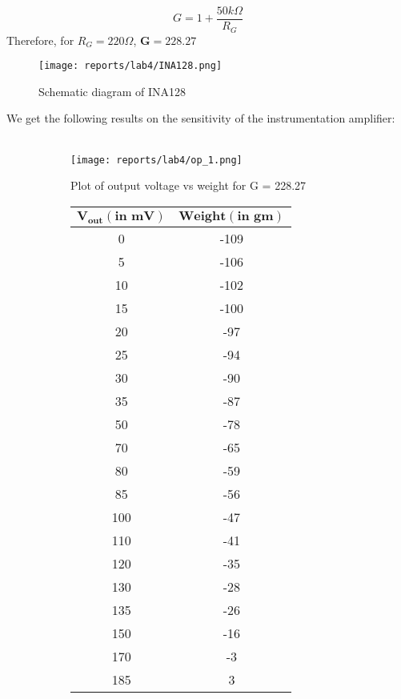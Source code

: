 \documentclass[12pt]{article}
\begin{document}
        \begin{equation}
            G = 1 + \frac{50k\Omega}{R_G}
        \end{equation}
        \noindent
        Therefore, for $R_G = 220\Omega$, $\mathbf{G = 228.27}$\\
        
        \begin{figure}[H]
          \centering
          \texttt{[image: reports/lab4/INA128.png]}
          \caption{Schematic diagram of INA128}
          \label{fig:instru}
        \end{figure}
        \noindent
        We get the following results on the sensitivity of the instrumentation amplifier:
        \\\\
        \begin{figure}[H]
            \begin{subfigure}{0.7\linewidth}
                \centering
                \texttt{[image: reports/lab4/op\_1.png]}
                \caption{Plot of output voltage vs weight for G = 228.27}
            \end{subfigure} 
            \begin{subfigure}{0.2\linewidth}
                \centering
                \begin{tabular}{|c|c|}
                \hline
                \bfseries $\mathbf{V_{out}(\text{in mV})}$	& \bfseries	$\mathbf{Weight(\text{in gm})}$	\\
                \hline
                    0  &	-109 \\
                    5  &	-106 \\
                    10 &	-102 \\
                    15 &	-100 \\
                    20 &	-97  \\
                    25 &	-94  \\
                    30 &	-90  \\
                    35 &	-87  \\
                    50 &	-78  \\
                    70 &	-65  \\
                    80 &	-59  \\
                    85 &	-56  \\
                    100&	-47  \\
                    110&	-41  \\
                    120&	-35  \\
                    130&	-28  \\
                    135&	-26  \\
                    150&	-16  \\
                    170&	-3   \\
                    185&	3    \\

                \hline
                \end{tabular}
            \end{subfigure} 
        \end{figure}
\end{document}
